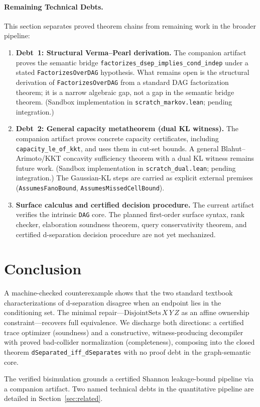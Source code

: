 \documentclass[acmsmall,screen,nonacm]{acmart}
\newcommand{\lean}[1]{\lstinline!#1!}
\begin{document}
\paragraph{Remaining Technical Debts.} This section separates proved theorem
chains from remaining work in the broader pipeline:
\begin{enumerate}
  \item \textbf{Debt~1: Structural Verma--Pearl derivation.}  The companion
    artifact proves the semantic bridge \lean{factorizes_dsep_implies_cond_indep} 
    under a stated \lean{FactorizesOverDAG} hypothesis. What remains open is the 
    structural derivation of \lean{FactorizesOverDAG} from a standard DAG 
    factorization theorem; it is a narrow algebraic gap, not a gap in the semantic 
    bridge theorem. (Sandbox implementation in \texttt{scratch\_markov.lean}; 
    pending integration.)
  \item \textbf{Debt~2: General capacity metatheorem (dual KL witness).}  The
    companion artifact proves concrete capacity certificates, including
    \lean{capacity_le_of_kkt}, and uses them in cut-set bounds.  A general
    Blahut--Arimoto/KKT concavity sufficiency theorem with a dual KL witness
    remains future work. (Sandbox implementation in \texttt{scratch\_dual.lean}; 
    pending integration.) The Gaussian-KL steps are carried as explicit external
    premises (\lean{AssumesFanoBound}, \lean{AssumesMissedCellBound}).
  \item \textbf{Surface calculus and certified decision procedure.}  The
    current artifact verifies the intrinsic \lean{DAG} core.  The planned
    first-order surface syntax, rank checker, elaboration soundness theorem,
    query conservativity theorem, and certified d-separation decision
    procedure are not yet mechanized.
\end{enumerate}

\section{Conclusion}\label{sec:conclusion}

A machine-checked counterexample shows that the two standard textbook
characterizations of d-separation disagree when an endpoint lies in the
conditioning set.  The minimal repair---$\text{DisjointSets}\,X\,Y\,Z$ as an
affine ownership constraint---recovers full equivalence.  We discharge both
directions: a certified trace optimizer (soundness) and a constructive,
witness-producing decompiler with proved bad-collider normalization
(completeness), composing into the closed theorem
\lean{dSeparated_iff_dSeparates} with no proof debt in the graph-semantic core.

The verified bisimulation grounds a certified Shannon leakage-bound pipeline
via a companion artifact. Two named technical debts in the quantitative 
pipeline are detailed in Section~\ref{sec:related}.





\end{document}

